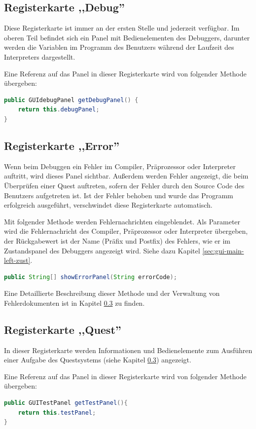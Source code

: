 \subsection{Registerkarte ,,Debug''}
Diese Registerkarte ist immer an der ersten Stelle und jederzeit verfügbar. Im oberen Teil befindet sich ein Panel mit Bedienelementen des Debuggers, darunter werden die Variablen im Programm des Benutzers während der Laufzeit des Interpreters dargestellt.

Eine Referenz auf das Panel in dieser Registerkarte wird von folgender Methode übergeben:
\begin{lstlisting}[language=JAVA]
public GUIdebugPanel getDebugPanel() {
	return this.debugPanel;
}
\end{lstlisting}

\subsection{Registerkarte ,,Error''}
Wenn beim Debuggen ein Fehler im Compiler, Präprozessor oder Interpreter auftritt, wird dieses Panel sichtbar. Außerdem werden Fehler angezeigt, die beim Überprüfen einer Quest auftreten, sofern der Fehler durch den Source Code des Benutzers aufgetreten ist. Ist der Fehler behoben und wurde das Programm erfolgreich ausgeführt, verschwindet diese Registerkarte automatisch.

Mit folgender Methode werden Fehlernachrichten eingeblendet. Als Parameter wird die Fehlernachricht des Compiler, Präprozessor oder Interpreter übergeben, der Rückgabewert ist der Name (Präfix und Postfix) des Fehlers, wie er im Zustandspanel des Debuggers angezeigt wird. Siehe dazu Kapitel \ref{sec:gui-main-left-zust}.
\begin{lstlisting}[language=JAVA]
public String[] showErrorPanel(String errorCode);
\end{lstlisting}

Eine Detaillierte Beschreibung dieser Methode und der Verwaltung von Fehlerdokumenten ist in Kapitel \ref{} zu finden.

\subsection{Registerkarte ,,Quest''}
In dieser Registerkarte werden Informationen und Bedienelemente zum Ausführen einer Aufgabe des Questsystems (siehe Kapitel \ref{}) angezeigt.

Eine Referenz auf das Panel in dieser Registerkarte wird von folgender Methode übergeben:
\begin{lstlisting}[language=JAVA]
public GUITestPanel getTestPanel(){
	return this.testPanel;
}
\end{lstlisting}

